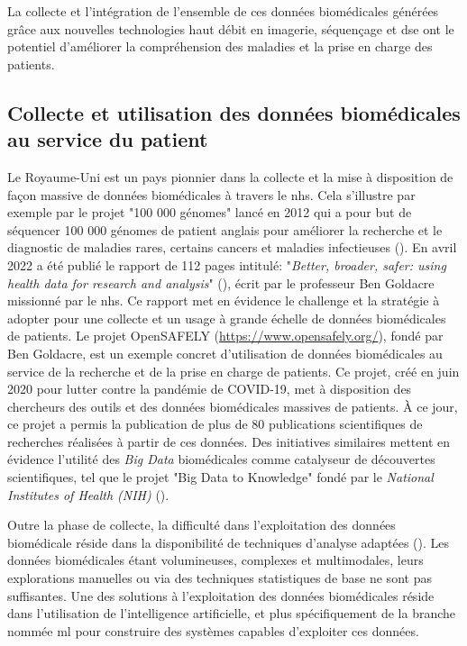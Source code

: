 La collecte et l'intégration de l'ensemble de ces données biomédicales générées grâce aux nouvelles technologies haut débit en imagerie, séquençage et \gls{dse} ont le potentiel d'améliorer la compréhension des maladies et la prise en charge des patients.

\subsection{Collecte et utilisation des données biomédicales au service du patient}
Le Royaume-Uni est un pays pionnier dans la collecte et la mise à disposition de façon massive de données biomédicales à travers le \gls{nhs}. Cela s'illustre par exemple par le projet "100 000 génomes" lancé en 2012 qui a pour but de séquencer 100 000 génomes de patient anglais pour améliorer la recherche et le diagnostic de maladies rares, certains cancers et maladies infectieuses (\cite{nunn_public_2019}). En avril 2022 a été publié le rapport de 112 pages intitulé: "\textit{Better, broader, safer: using health data for research and analysis}" (\cite{ben_goldacre_better_2022}), écrit par le professeur Ben Goldacre missionné par le \gls{nhs}. Ce rapport met en évidence le challenge et la stratégie à adopter pour une collecte et un usage à grande échelle de données biomédicales de patients. Le projet OpenSAFELY (\href{https://www.opensafely.org/}{https://www.opensafely.org/}), fondé par Ben Goldacre, est un exemple concret d'utilisation de données biomédicales au service de la recherche et de la prise en charge de patients. Ce projet, créé en juin 2020 pour lutter contre la pandémie de COVID-19, met à disposition des chercheurs des outils et des données biomédicales massives de patients. À ce jour, ce projet a permis la publication de plus de 80 publications scientifiques de recherches réalisées à partir de ces données. Des initiatives similaires  mettent en évidence l'utilité des \textit{Big Data} biomédicales comme catalyseur de découvertes scientifiques, tel que le projet "Big Data to Knowledge" fondé par le \textit{National Institutes of Health (NIH)} (\cite{toga_big_2015}).

Outre la phase de collecte, la difficulté dans l'exploitation des données biomédicale réside dans la disponibilité de techniques d'analyse adaptées (\cite{wang_big_2019, ismail_requirements_2020}). Les données biomédicales étant volumineuses, complexes et multimodales, leurs explorations manuelles ou via des techniques statistiques de base ne sont pas suffisantes. Une des solutions à l'exploitation des données biomédicales réside dans l'utilisation de l'intelligence artificielle, et plus spécifiquement de la branche nommée \gls{ml} pour construire des systèmes capables d'exploiter ces données.


